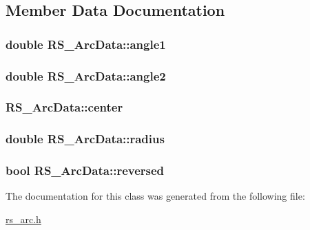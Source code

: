\subsection{Member Data Documentation}
\hypertarget{class_r_s___arc_data_a4d8201f6ecb109a2fccf1185df3689aa}{
\subsubsection[{angle1}]{\setlength{\rightskip}{0pt plus 5cm}double R\-S\-\_\-\-Arc\-Data\-::angle1}}\label{class_r_s___arc_data_a4d8201f6ecb109a2fccf1185df3689aa}
\hypertarget{class_r_s___arc_data_a87b35df714454db8549bc8e5190f1e91}{
\subsubsection[{angle2}]{\setlength{\rightskip}{0pt plus 5cm}double R\-S\-\_\-\-Arc\-Data\-::angle2}}\label{class_r_s___arc_data_a87b35df714454db8549bc8e5190f1e91}
\hypertarget{class_r_s___arc_data_a9e8f7a77a60b662b84fcb3cff5af3634}{
\subsubsection[{center}]{ R\-S\-\_\-\-Arc\-Data\-::center}}\label{class_r_s___arc_data_a9e8f7a77a60b662b84fcb3cff5af3634}
\hypertarget{class_r_s___arc_data_a71a5a262e6d9f59d89a16f97a39ba562}{
\subsubsection[{radius}]{\setlength{\rightskip}{0pt plus 5cm}double R\-S\-\_\-\-Arc\-Data\-::radius}}\label{class_r_s___arc_data_a71a5a262e6d9f59d89a16f97a39ba562}
\hypertarget{class_r_s___arc_data_a6f4ae85fb64896b834fcea80e50ab9ad}{
\subsubsection[{reversed}]{\setlength{\rightskip}{0pt plus 5cm}bool R\-S\-\_\-\-Arc\-Data\-::reversed}}\label{class_r_s___arc_data_a6f4ae85fb64896b834fcea80e50ab9ad}


The documentation for this class was generated from the following file\-:\begin{DoxyCompactItemize}
\item 
\hyperlink{rs__arc_8h}{rs\-\_\-arc.\-h}\end{DoxyCompactItemize}
